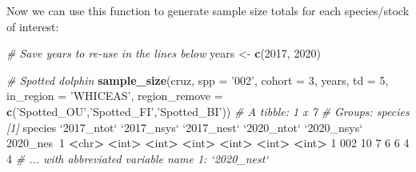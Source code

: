 \documentclass[
]{book}
\newenvironment{Shaded}{\begin{snugshade}}{\end{snugshade}}
\newcommand{\CommentTok}[1]{\textcolor[rgb]{0.56,0.35,0.01}{\textit{#1}}}
\newcommand{\DataTypeTok}[1]{\textcolor[rgb]{0.13,0.29,0.53}{#1}}
\newcommand{\DecValTok}[1]{\textcolor[rgb]{0.00,0.00,0.81}{#1}}
\newcommand{\ErrorTok}[1]{\textcolor[rgb]{0.64,0.00,0.00}{\textbf{#1}}}
\newcommand{\KeywordTok}[1]{\textcolor[rgb]{0.13,0.29,0.53}{\textbf{#1}}}
\newcommand{\NormalTok}[1]{#1}
\newcommand{\OperatorTok}[1]{\textcolor[rgb]{0.81,0.36,0.00}{\textbf{#1}}}
\newcommand{\StringTok}[1]{\textcolor[rgb]{0.31,0.60,0.02}{#1}}
\begin{document}
Now we can use this function to generate sample size totals for each species/stock of interest:

\begin{Shaded}
\begin{Highlighting}[]
\CommentTok{# Save years to re-use in the lines below}
\NormalTok{years <-}\StringTok{ }\KeywordTok{c}\NormalTok{(}\DecValTok{2017}\NormalTok{, }\DecValTok{2020}\NormalTok{)}

\CommentTok{# Spotted dolphin}
\KeywordTok{sample_size}\NormalTok{(cruz, }
            \DataTypeTok{spp =} \StringTok{'002'}\NormalTok{, }
            \DataTypeTok{cohort =} \DecValTok{3}\NormalTok{, }
\NormalTok{            years, }
            \DataTypeTok{td =} \DecValTok{5}\NormalTok{, }
            \DataTypeTok{in_region =} \StringTok{'WHICEAS'}\NormalTok{,}
            \DataTypeTok{region_remove =} \KeywordTok{c}\NormalTok{(}\StringTok{'Spotted_OU'}\NormalTok{,}\StringTok{'Spotted_FI'}\NormalTok{,}\StringTok{'Spotted_BI'}\NormalTok{))}
\CommentTok{# A tibble: 1 x 7}
\CommentTok{# Groups:   species [1]}
\NormalTok{  species }\StringTok{`}\DataTypeTok{2017_ntot}\StringTok{`} \StringTok{`}\DataTypeTok{2017_nsys}\StringTok{`} \StringTok{`}\DataTypeTok{2017_nest}\StringTok{`} \StringTok{`}\DataTypeTok{2020_ntot}\StringTok{`} \StringTok{`}\DataTypeTok{2020_nsys}\StringTok{`} \DecValTok{2020}\NormalTok{_nes}\OperatorTok{~}\DecValTok{1}
  \OperatorTok{<}\NormalTok{chr}\OperatorTok{>}\StringTok{         }\ErrorTok{<}\NormalTok{int}\OperatorTok{>}\StringTok{       }\ErrorTok{<}\NormalTok{int}\OperatorTok{>}\StringTok{       }\ErrorTok{<}\NormalTok{int}\OperatorTok{>}\StringTok{       }\ErrorTok{<}\NormalTok{int}\OperatorTok{>}\StringTok{       }\ErrorTok{<}\NormalTok{int}\OperatorTok{>}\StringTok{      }\ErrorTok{<}\NormalTok{int}\OperatorTok{>}
\DecValTok{1} \DecValTok{002}              \DecValTok{10}           \DecValTok{7}           \DecValTok{6}           \DecValTok{6}           \DecValTok{4}          \DecValTok{4}
\CommentTok{# ... with abbreviated variable name 1: `2020_nest`}


\end{Highlighting}
\end{Shaded}
\end{document}
